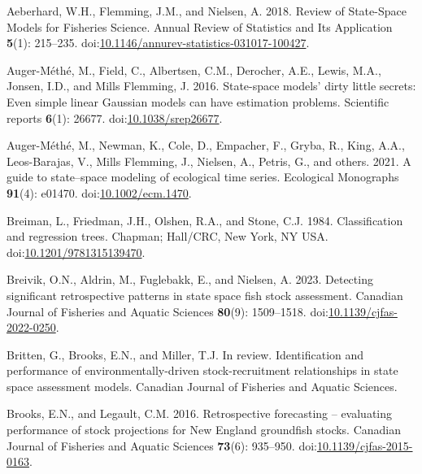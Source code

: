 \documentclass[
  12pt,
]{article}
\newlength{\cslhangindent}
\newenvironment{CSLReferences}[2] %
 {\begin{list}{}{%
  \setlength{\itemindent}{0pt}
  \setlength{\leftmargin}{0pt}
  \setlength{\parsep}{0pt}
  \ifodd #1
   \setlength{\leftmargin}{\cslhangindent}
   \setlength{\itemindent}{-1\cslhangindent}
  \fi
  \setlength{\itemsep}{#2\baselineskip}}}
 {\end{list}}
\begin{document}
\protect{}\label{refs}
\begin{CSLReferences}{1}{0}
Aeberhard, W.H., Flemming, J.M., and Nielsen, A. 2018. Review of
{State}-{Space Models} for {Fisheries Science}. Annual Review of
Statistics and Its Application \textbf{5}(1): 215--235.
doi:\href{https://doi.org/10.1146/annurev-statistics-031017-100427}{10.1146/annurev-statistics-031017-100427}.

Auger-Méthé, M., Field, C., Albertsen, C.M., Derocher, A.E., Lewis,
M.A., Jonsen, I.D., and Mills Flemming, J. 2016. State-space models'
dirty little secrets: Even simple linear {G}aussian models can have
estimation problems. Scientific reports \textbf{6}(1): 26677.
doi:\href{https://doi.org/10.1038/srep26677}{10.1038/srep26677}.

{Auger-Méthé, M., Newman, K., Cole, D., Empacher, F., Gryba, R., King,
A.A., Leos-Barajas, V., Mills Flemming, J., Nielsen, A., Petris, G., and
others}. 2021. A guide to state--space modeling of ecological time
series. Ecological Monographs \textbf{91}(4): e01470.
doi:\href{https://doi.org/10.1002/ecm.1470}{10.1002/ecm.1470}.

Breiman, L., Friedman, J.H., Olshen, R.A., and Stone, C.J. 1984.
Classification and regression trees. Chapman; Hall/CRC, New York, NY
USA.
doi:\href{https://doi.org/10.1201/9781315139470}{10.1201/9781315139470}.

Breivik, O.N., Aldrin, M., Fuglebakk, E., and Nielsen, A. 2023.
Detecting significant retrospective patterns in state space fish stock
assessment. Canadian Journal of Fisheries and Aquatic Sciences
\textbf{80}(9): 1509--1518.
doi:\href{https://doi.org/10.1139/cjfas-2022-0250}{10.1139/cjfas-2022-0250}.

Britten, G., Brooks, E.N., and Miller, T.J. In review. Identification
and performance of environmentally-driven stock-recruitment
relationships in state space assessment models. Canadian Journal of
Fisheries and Aquatic Sciences.

Brooks, E.N., and Legault, C.M. 2016. Retrospective forecasting --
evaluating performance of stock projections for {N}ew {E}ngland
groundfish stocks. Canadian Journal of Fisheries and Aquatic Sciences
\textbf{73}(6): 935--950.
doi:\href{https://doi.org/10.1139/cjfas-2015-0163}{10.1139/cjfas-2015-0163}.


\end{CSLReferences}
\end{document}
